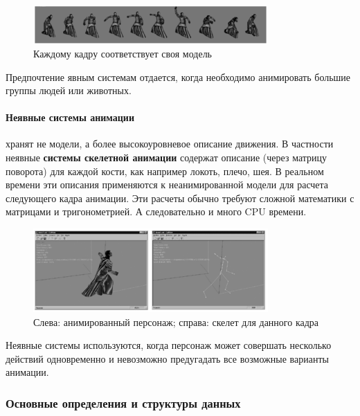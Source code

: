 \begin{figure}[h!]
    \centering
    \includegraphics[width=0.8\textwidth]{explicit_animation.png}
    \caption{Каждому кадру соответствует своя модель}
\end{figure}

Предпочтение явным системам отдается, когда необходимо анимировать большие группы людей или животных.

\paragraph{Неявные системы анимации} хранят не модели, а более высокоуровневое описание движения.
В частности неявные \textbf{системы скелетной анимации} содержат описание (через матрицу поворота) для каждой кости, как например локоть, плечо, шея.
В реальном времени эти описания применяются к неанимированной модели для расчета следующего кадра анимации.
Эти расчеты обычно требуют сложной математики с матрицами и тригонометрией.
А следовательно и много CPU времени.


\begin{figure}[h!]
    \centering
    \includegraphics[width=0.8\textwidth]{implicit_animation.png}
    \caption{\scriptsize{Слева: анимированный персонаж; справа: скелет для данного кадра}}
\end{figure}

Неявные системы используются, когда персонаж может совершать несколько действий одновременно и невозможно предугадать все возможные варианты анимации.

\subsubsection{Основные определения и структуры данных}

